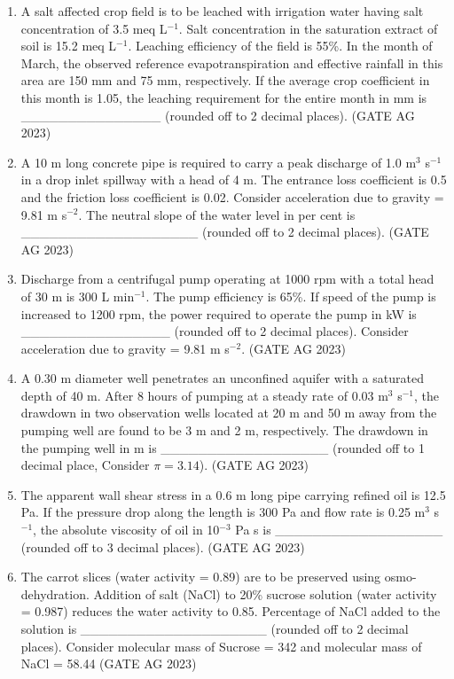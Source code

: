 \documentclass[journal,12pt,onecolumn]{IEEEtran}
\theoremstyle{remark}
\begin{document}
\begin{enumerate}
    \item A salt affected crop field is to be leached with irrigation water having salt concentration of 3.5 meq L$^{-1}$. Salt concentration in the saturation extract of soil is 15.2 meq L$^{-1}$. Leaching efficiency of the field is 55\%. In the month of March, the observed reference evapotranspiration and effective rainfall in this area are 150 mm and 75 mm, respectively. If the average crop coefficient in this month is 1.05, the leaching requirement for the entire month in mm is \_\_\_\_\_\_\_\_\_\_\_\_\_\_\_ (rounded off to 2 decimal places).
\hfill{(GATE AG 2023)}

    \item A 10 m long concrete pipe is required to carry a peak discharge of 1.0 m$^{3}$ s$^{-1}$ in a drop inlet spillway with a head of 4 m. The entrance loss coefficient is 0.5 and the friction loss coefficient is 0.02. Consider acceleration due to gravity = 9.81 m s$^{-2}$. The neutral slope of the water level in per cent is \_\_\_\_\_\_\_\_\_\_\_\_\_\_\_\_\_\_\_ (rounded off to 2 decimal places).
\hfill{(GATE AG 2023)}

    \item Discharge from a centrifugal pump operating at 1000 rpm with a total head of 30 m is 300 L min$^{-1}$. The pump efficiency is 65\%. If speed of the pump is increased to 1200 rpm, the power required to operate the pump in kW is \_\_\_\_\_\_\_\_\_\_\_\_\_\_\_\_ (rounded off to 2 decimal places).
    Consider acceleration due to gravity = 9.81 m s$^{-2}$.
\hfill{(GATE AG 2023)}

    \item A 0.30 m diameter well penetrates an unconfined aquifer with a saturated depth of 40 m. After 8 hours of pumping at a steady rate of 0.03 m$^{3}$ s$^{-1}$, the drawdown in two observation wells located at 20 m and 50 m away from the pumping well are found to be 3 m and 2 m, respectively. The drawdown in the pumping well in m is \_\_\_\_\_\_\_\_\_\_\_\_\_\_\_\_\_\_ (rounded off to 1 decimal place, Consider $\pi = 3.14$).
    \hfill{(GATE AG 2023)}

    \item The apparent wall shear stress in a 0.6 m long pipe carrying refined oil is 12.5 Pa. If the pressure drop along the length is 300 Pa and flow rate is 0.25 m$^{3}$ s$^{-1}$, the absolute viscosity of oil in 10$^{-3}$ Pa s is \_\_\_\_\_\_\_\_\_\_\_\_\_\_\_\_\_\_ (rounded off to 3 decimal places).
\hfill{(GATE AG 2023)}

    \item The carrot slices (water activity = 0.89) are to be preserved using osmo-dehydration. Addition of salt (NaCl) to 20\% sucrose solution (water activity = 0.987) reduces the water activity to 0.85. Percentage of NaCl added to the solution is \_\_\_\_\_\_\_\_\_\_\_\_\_\_\_\_\_\_\_\_ (rounded off to 2 decimal places).
    Consider molecular mass of Sucrose = 342 and molecular mass of NaCl = 58.44
\hfill{(GATE AG 2023)}


\end{enumerate}
\end{document}
